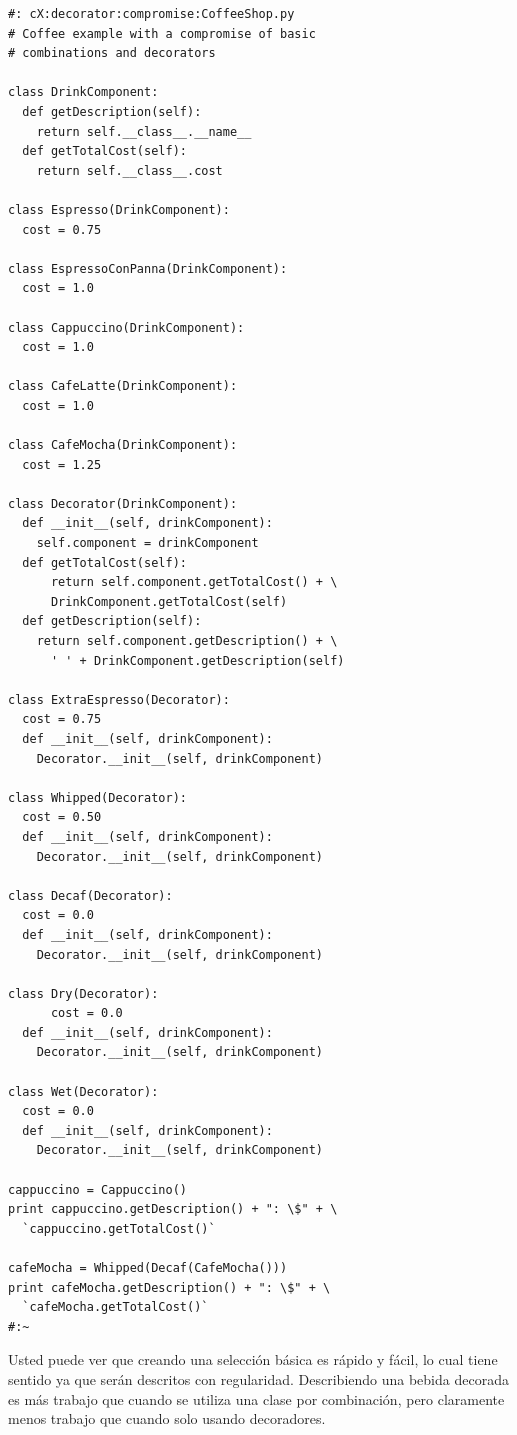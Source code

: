\documentclass{article}
\begin{document}
\begin{lstlisting} 
#: cX:decorator:compromise:CoffeeShop.py 
# Coffee example with a compromise of basic 
# combinations and decorators 

class DrinkComponent: 
  def getDescription(self): 
    return self.__class__.__name__ 
  def getTotalCost(self): 
    return self.__class__.cost 
    
class Espresso(DrinkComponent): 
  cost = 0.75 
  
class EspressoConPanna(DrinkComponent): 
  cost = 1.0 
  
class Cappuccino(DrinkComponent): 
  cost = 1.0 
  
class CafeLatte(DrinkComponent): 
  cost = 1.0 
  
class CafeMocha(DrinkComponent): 
  cost = 1.25 
  
class Decorator(DrinkComponent): 
  def __init__(self, drinkComponent): 
    self.component = drinkComponent 
  def getTotalCost(self): 
      return self.component.getTotalCost() + \ 
      DrinkComponent.getTotalCost(self) 
  def getDescription(self): 
    return self.component.getDescription() + \ 
      ' ' + DrinkComponent.getDescription(self) 
      
class ExtraEspresso(Decorator): 
  cost = 0.75 
  def __init__(self, drinkComponent): 
    Decorator.__init__(self, drinkComponent) 
    
class Whipped(Decorator): 
  cost = 0.50 
  def __init__(self, drinkComponent): 
    Decorator.__init__(self, drinkComponent) 
    
class Decaf(Decorator): 
  cost = 0.0 
  def __init__(self, drinkComponent): 
    Decorator.__init__(self, drinkComponent) 
    
class Dry(Decorator): 
      cost = 0.0 
  def __init__(self, drinkComponent): 
    Decorator.__init__(self, drinkComponent) 
    
class Wet(Decorator): 
  cost = 0.0 
  def __init__(self, drinkComponent): 
    Decorator.__init__(self, drinkComponent) 
    
cappuccino = Cappuccino() 
print cappuccino.getDescription() + ": \$" + \ 
  `cappuccino.getTotalCost()` 
  
cafeMocha = Whipped(Decaf(CafeMocha())) 
print cafeMocha.getDescription() + ": \$" + \ 
  `cafeMocha.getTotalCost()` 
#:~ 
\end{lstlisting}

Usted puede ver que creando una selección básica es rápido y fácil, lo cual tiene sentido ya que serán descritos con regularidad. Describiendo una bebida decorada es más trabajo que cuando se utiliza una clase por combinación, pero claramente menos trabajo que cuando solo usando decoradores.    \newline
\end{document}
